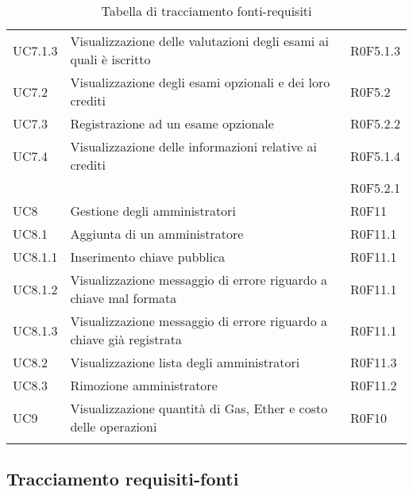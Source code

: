 \documentclass[AnalisiDeiRequisiti.tex]{subfiles}
\begin{document}
\begin{longtable}[H]{p{2cm}p{5cm}p{5cm}}
	UC7.1.3 & Visualizzazione delle valutazioni degli esami ai quali è iscritto	& R0F5.1.3 \\  
	UC7.2 & Visualizzazione degli esami opzionali e dei loro crediti & R0F5.2 \\  
	UC7.3 & Registrazione ad un esame opzionale & R0F5.2.2 \\  
	UC7.4 & Visualizzazione delle informazioni relative ai crediti & R0F5.1.4 \\ 
	& & R0F5.2.1 \\  
	UC8 & Gestione degli amministratori & R0F11 \\  
	UC8.1 & Aggiunta di un amministratore & R0F11.1 \\  
	UC8.1.1 & Inserimento chiave pubblica & R0F11.1 \\  
	UC8.1.2 & Visualizzazione messaggio di errore riguardo a chiave mal formata & R0F11.1 \\  
	UC8.1.3 & Visualizzazione messaggio di errore riguardo a chiave già registrata & R0F11.1 \\  
	UC8.2 & Visualizzazione lista degli amministratori & R0F11.3 \\  
	UC8.3 & Rimozione amministratore & R0F11.2 \\  
	UC9 & Visualizzazione quantità di Gas, Ether e costo delle operazioni & R0F10 \\  
	\hiderowcolors
	\caption{Tabella di tracciamento fonti-requisiti}
\end{longtable}

\subsection{Tracciamento requisiti-fonti}
\end{document}
